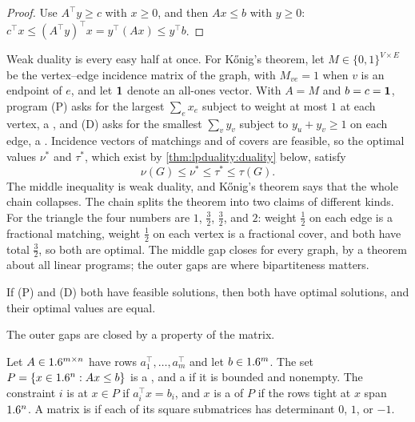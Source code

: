 \begin{refsection}
\begin{proof}
Use $A^\top y\ge c$ with $x\ge0$, and then $Ax\le b$ with $y\ge0$: $c^\top x\le (A^\top y)^\top x=y^\top(Ax)\le y^\top b$.
\end{proof}

Weak duality is every easy half at once. For K\H{o}nig's theorem, let $M\in\{0,1\}^{V\times E}$ be the vertex--edge incidence matrix of the graph, with $M_{ve}=1$ when $v$ is an endpoint of $e$, and let $\mathbf{1}$ denote an all-ones vector. With $A=M$ and $b=c=\mathbf{1}$, program (P) asks for the largest $\sum_e x_e$ subject to weight at most $1$ at each vertex, a , and (D) asks for the smallest $\sum_v y_v$ subject to $y_u+y_v\ge1$ on each edge, a . Incidence vectors of matchings and of covers are feasible, so the optimal values $\nu^*$ and $\tau^*$, which exist by \cref{thm:lpduality:duality} below, satisfy
\begin{equation}\label{eq:lpduality:chain}
\nu(G)\le\nu^*\le\tau^*\le\tau(G).
\end{equation}
The middle inequality is weak duality, and K\H{o}nig's theorem says that the whole chain collapses. The chain splits the theorem into two claims of different kinds. For the triangle the four numbers are $1$, $\frac32$, $\frac32$, and $2$: weight $\frac12$ on each edge is a fractional matching, weight $\frac12$ on each vertex is a fractional cover, and both have total $\frac32$, so both are optimal. The middle gap closes for every graph, by a theorem about all linear programs; the outer gaps are where bipartiteness matters.

\begin{theorem}\label{thm:lpduality:duality}
If \textup{(P)} and \textup{(D)} both have feasible solutions, then both have optimal solutions, and their optimal values are equal.
\end{theorem}

The outer gaps are closed by a property of the matrix.

\begin{definition}\label{def:lpduality:tu}
Let $A\in1.6^{m\times n}$ have rows $a_1^\top,\dots,a_m^\top$ and let $b\in1.6^m$. The set $P=\{x\in1.6^n:Ax\le b\}$ is a , and a  if it is bounded and nonempty. The constraint $i$ is  at $x\in P$ if $a_i^\top x=b_i$, and $x$ is a  of $P$ if the rows tight at $x$ span $1.6^n$. A matrix is  if each of its square submatrices has determinant $0$, $1$, or $-1$.
\end{definition}


\end{refsection}
